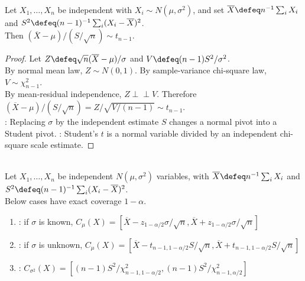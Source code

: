 \begin{corollary} \label{cor:normal-student-t-pivot} \\
Let $X_1,\ldots,X_n$ be independent with $X_i\sim N(\mu,\sigma^2)$, and set $\overline{X}\defeq n^{-1}\sum_iX_i$ and $S^2\defeq(n-1)^{-1}\sum_i(X_i-\overline{X})^2$.\\
Then $(\overline{X}-\mu)/(S/\sqrt n)\sim t_{n-1}$.
\begin{proof} Let $Z\defeq\sqrt n(\overline{X}-\mu)/\sigma$ and $V\defeq(n-1)S^2/\sigma^2$.\\
By normal mean law, $Z\sim N(0,1)$. By sample-variance chi-square law, $V\sim\chi^2_{n-1}$.\\
By mean-residual independence, $Z\perp\!\!\!\perp V$. Therefore $(\overline{X}-\mu)/(S/\sqrt n)=Z/\sqrt{V/(n-1)}\sim t_{n-1}$.\\
: Replacing $\sigma$ by the independent estimate $S$ changes a normal pivot into a Student pivot.
: Student's $t$ is a normal variable divided by an independent chi-square scale estimate.
\end{proof}
\end{corollary}

\begin{method} \label{meth:normal-mean-exact-confidence-intervals} \\
Let $X_1,\ldots,X_n$ be independent $N(\mu,\sigma^2)$ variables, with $\overline{X}\defeq n^{-1}\sum_iX_i$ and $S^2\defeq(n-1)^{-1}\sum_i(X_i-\overline{X})^2$.\\
Below cases have exact coverage $1-\alpha$.
\begin{enumerate}[label=(\roman*)]
\setlength{\itemsep}{0pt}
\item {}: if $\sigma$ is known, $C_\mu(X)=[\overline{X}-z_{1-\alpha/2}\sigma/\sqrt n,\overline{X}+z_{1-\alpha/2}\sigma/\sqrt n]$
\item {}: if $\sigma$ is unknown, $C_\mu(X)=[\overline{X}-t_{n-1,1-\alpha/2}S/\sqrt n,\overline{X}+t_{n-1,1-\alpha/2}S/\sqrt n]$
\item {}: $C_{\sigma^2}(X)=[(n-1)S^2/\chi^2_{n-1,1-\alpha/2},(n-1)S^2/\chi^2_{n-1,\alpha/2}]$
\end{enumerate}
\end{method}
